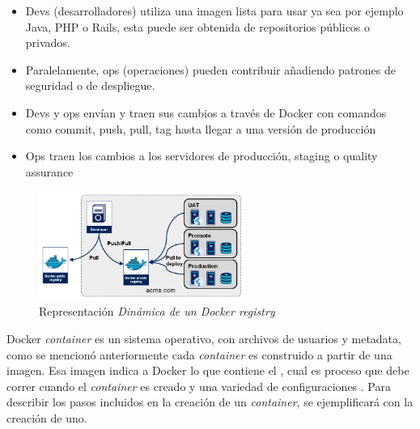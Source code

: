 \documentclass[letter,10pt]{article}
\begin{document}
	\begin{itemize}
		\item Devs (desarrolladores) utiliza una imagen lista para usar ya sea por ejemplo Java, PHP o Rails, esta puede ser obtenida de repositorios públicos o privados.
		\item Paralelamente, ops (operaciones) pueden contribuir añadiendo patrones de seguridad o de despliegue.
		\item Devs y ops envían y traen sus cambios a través de Docker con comandos como commit, push, pull, tag hasta llegar a una versión de producción
		\item Ops traen los cambios a los servidores de producción, staging o quality assurance
	\end{itemize}
	
\begin{figure}[H]
  \centering
  \includegraphics[width=0.6\textwidth]{images/registry-dynamic.png}
    \caption{Representación \textit{Dinámica de un \textit{Docker registry} }}
    \label{fig:dynamic}
\end{figure}	
	
Docker \textit{container} es un sistema operativo, con archivos de usuarios y metadata, como se mencionó anteriormente cada \textit{container} es construido a partir de una imagen. Esa imagen indica a Docker lo que contiene el \container, cual es proceso que debe correr cuando el  \textit{container} es creado y una variedad de configuraciones \cite{Docker:2015:understanding}. Para describir los pasos incluidos en la creación de un \emph{container}, se ejemplificará con la creación de uno.
\end{document}
